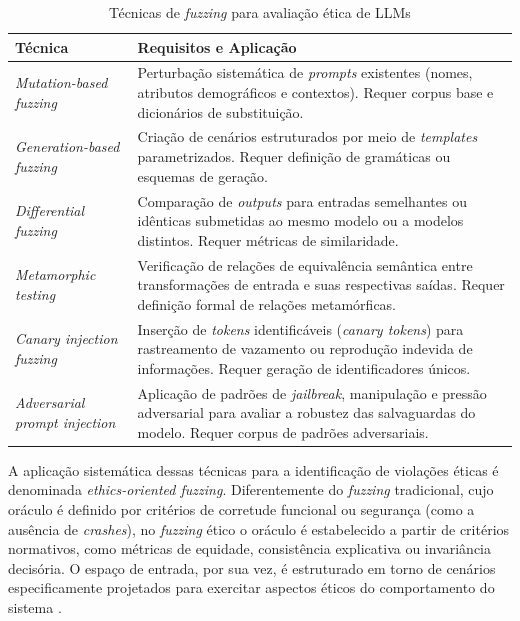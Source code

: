 \begin{table}[htbp]
\centering
\caption{Técnicas de \textit{fuzzing} para avaliação ética de LLMs}
\label{tab:tecnicas-fuzzing}
\begin{tabular}{p{4.5cm}p{10.5cm}}
\toprule
\textbf{Técnica} & \textbf{Requisitos e Aplicação} \\
\midrule
\textit{Mutation-based fuzzing} \cite{Manes2021, Xie2019, Kusner2017} & Perturbação sistemática de \textit{prompts} existentes (nomes, atributos demográficos e contextos). Requer corpus base e dicionários de substituição. \\
\addlinespace
\textit{Generation-based fuzzing} \cite{GodefroidGrammar2008, Wang2017, Perez2022} & Criação de cenários estruturados por meio de \textit{templates} parametrizados. Requer definição de gramáticas ou esquemas de geração. \\
\addlinespace
\textit{Differential fuzzing} \cite{McKeeman1998, Chen2016, Galhotra2017} & Comparação de \textit{outputs} para entradas semelhantes ou idênticas submetidas ao mesmo modelo ou a modelos distintos. Requer métricas de similaridade. \\
\addlinespace
\textit{Metamorphic testing} \cite{Chen2018, Chen1998, Xie2011, Murphy2008} & Verificação de relações de equivalência semântica entre transformações de entrada e suas respectivas saídas. Requer definição formal de relações metamórficas. \\
\addlinespace
\textit{Canary injection fuzzing} \cite{Cowan1998, Carlini2021} & Inserção de \textit{tokens} identificáveis (\textit{canary tokens}) para rastreamento de vazamento ou reprodução indevida de informações. Requer geração de identificadores únicos. \\
\addlinespace
\textit{Adversarial prompt injection} \cite{Schulhoff2023, Greshake2023, Liu2023} & Aplicação de padrões de \textit{jailbreak}, manipulação e pressão adversarial para avaliar a robustez das salvaguardas do modelo. Requer corpus de padrões adversariais. \\
\bottomrule
\end{tabular}
\end{table}

A aplicação sistemática dessas técnicas para a identificação de violações éticas é denominada \textit{ethics-oriented fuzzing}. Diferentemente do \textit{fuzzing} tradicional, cujo oráculo é definido por critérios de corretude funcional ou segurança (como a ausência de \textit{crashes}), no \textit{fuzzing} ético o oráculo é estabelecido a partir de critérios normativos, como métricas de equidade, consistência explicativa ou invariância decisória. O espaço de entrada, por sua vez, é estruturado em torno de cenários especificamente projetados para exercitar aspectos éticos do comportamento do sistema \cite{Manes2021, Galhotra2017, Chen2018}.

